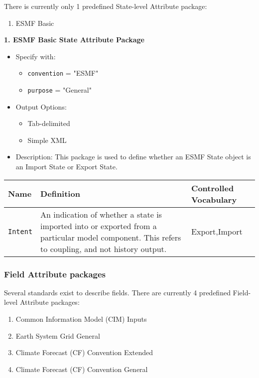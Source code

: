 There is currently only 1 predefined State-level Attribute package:

\begin{enumerate}
    \item ESMF Basic
\end{enumerate}


\vspace{.20in}
{\bf 1. ESMF Basic State Attribute Package}

\begin{itemize}
    \item Specify with:
    \begin{itemize}
        \item {\tt convention} = "ESMF"
        \item {\tt purpose} = "General"
    \end{itemize}
    \item Output Options:
    \begin{itemize}
        \item Tab-delimited
        \item Simple XML
    \end{itemize}
    \item Description: This package is used to define whether an ESMF State object is an Import State or Export State.
\end{itemize}

\begin{tabular}{|p{5cm}|p{5cm}|p{4cm}|}
    \hline\hline
    {\bf Name } & {\bf Definition} & {\bf Controlled Vocabulary} \\
    \hline\hline
    {\tt Intent} & An indication of whether a state is imported into or exported from a particular model component. This refers to coupling, and not history output. & Export,Import \\
    \hline\hline
\end{tabular}

\vspace{.20in}

\subsubsection{Field Attribute packages}
\label{FieldAttributePackages}

Several standards exist to describe fields. There are currently 4 predefined Field-level Attribute packages:

\begin{enumerate}
    \item Common Information Model (CIM) Inputs
    \item Earth System Grid General
    \item Climate Forecast (CF) Convention Extended
    \item Climate Forecast (CF) Convention General
\end{enumerate}

